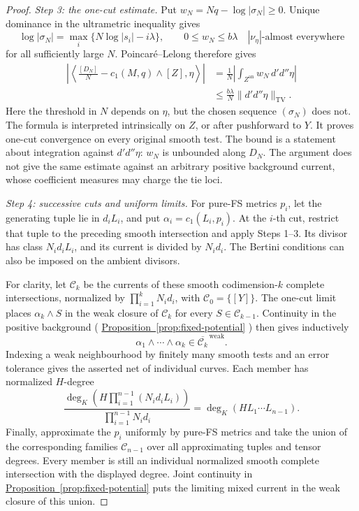 \documentclass[11pt]{amsart}
\theoremstyle{definition}
\theoremstyle{remark}
\numberwithin{equation}{section}
\newcommand{\ddc}{d'd''}
\newcommand{\an}{\mathrm{an}}
\newcommand{\namedref}[2]{%
 \begingroup
 \ifstrequal{#1}{Section}{\hypersetup{linkcolor=sectionteal}}{%
  \ifstrequal{#1}{Appendix}{\hypersetup{linkcolor=sectionteal}}{}}%
 \hyperref[#2]{#1~\ref*{#2}}%
 \endgroup}
\newcommand{\TV}{\mathrm{TV}}
\begin{document}
\begin{proof}
\emph{Step 3: the one-cut estimate.}
Put \(w_N=Nq-\log|\sigma_N|\geq0\).
Unique dominance in the ultrametric inequality gives
\[
 \log|\sigma_N|
   =\max_i\{N\log|s_i|-i\lambda\},\qquad
 0\leq w_N\leq b\lambda
 \quad |\nu_\eta|\text{-almost everywhere}
\]
for all sufficiently large \(N\).
Poincar\'e--Lelong therefore gives
\begin{equation}\label{eq:haar-error}
 \begin{split}
 \left|\left\langle
 \frac{[D_N]}N-c_1(M,q)\wedge[Z],\eta
 \right\rangle\right|
 &=\frac1N\left|\int_{Z^\an}w_N\,\ddc\eta\right|\\
 &\leq\frac{b\lambda}{N}\|\ddc\eta\|_{\TV}.
 \end{split}
\end{equation}
Here the threshold in \(N\) depends on \(\eta\), but the chosen
sequence \((\sigma_N)\) does not. The formula is interpreted
intrinsically on \(Z\), or after pushforward to \(Y\).
It proves one-cut convergence on every original smooth test.
The bound is a statement about integration against \(\ddc\eta\):
\(w_N\) is unbounded along \(D_N\). The argument does not give
the same estimate against an arbitrary positive background current,
whose coefficient measures may charge the tie loci.

\emph{Step 4: successive cuts and uniform limits.}
For pure-FS metrics \(p_i\), let the generating tuple lie in
\(d_iL_i\), and put \(\alpha_i=c_1(L_i,p_i)\).
At the \(i\)-th cut, restrict that tuple to the preceding smooth
intersection and apply Steps 1--3. Its divisor has class
\(N_id_iL_i\), and its current is divided by \(N_id_i\).
The Bertini conditions can also be imposed on the ambient divisors.

For clarity, let \(\mathcal C_k\) be the currents of these smooth
codimension-\(k\) complete intersections, normalized by
\(\prod_{i=1}^kN_id_i\), with \(\mathcal C_0=\{[Y]\}\).
The one-cut limit places
\(\alpha_k\wedge S\) in the weak closure of \(\mathcal C_k\)
for every \(S\in\mathcal C_{k-1}\).
Continuity in the positive background
(\namedref{Proposition}{prop:fixed-potential}) then gives inductively
\[
 \alpha_1\wedge\cdots\wedge\alpha_k
 \in\overline{\mathcal C_k}^{\,\mathrm{weak}}.
\]
Indexing a weak neighbourhood by finitely many smooth tests and
an error tolerance gives the asserted net of individual curves.
Each member has normalized \(H\)-degree
\[
 \frac{\deg_K\!\left(H\prod_{i=1}^{n-1}(N_id_iL_i)\right)}
      {\prod_{i=1}^{n-1}N_id_i}
 =\deg_K(HL_1\cdots L_{n-1}).
\]
Finally, approximate the \(p_i\) uniformly by pure-FS metrics and
take the union of the corresponding families \(\mathcal C_{n-1}\)
over all approximating tuples and tensor degrees. Every member
is still an individual normalized smooth complete intersection
with the displayed degree. Joint continuity in
\namedref{Proposition}{prop:fixed-potential} puts the limiting mixed
current in the weak closure of this union.
\end{proof}
\end{document}
